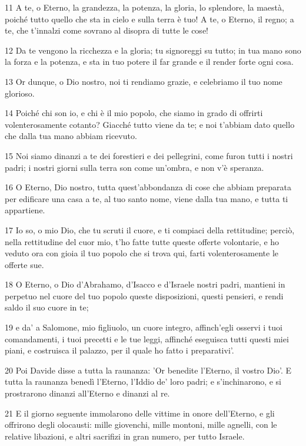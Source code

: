 \par 11 A te, o Eterno, la grandezza, la potenza, la gloria, lo splendore, la maestà, poiché tutto quello che sta in cielo e sulla terra è tuo! A te, o Eterno, il regno; a te, che t'innalzi come sovrano al disopra di tutte le cose!
\par 12 Da te vengono la ricchezza e la gloria; tu signoreggi su tutto; in tua mano sono la forza e la potenza, e sta in tuo potere il far grande e il render forte ogni cosa.
\par 13 Or dunque, o Dio nostro, noi ti rendiamo grazie, e celebriamo il tuo nome glorioso.
\par 14 Poiché chi son io, e chi è il mio popolo, che siamo in grado di offrirti volenterosamente cotanto? Giacché tutto viene da te; e noi t'abbiam dato quello che dalla tua mano abbiam ricevuto.
\par 15 Noi siamo dinanzi a te dei forestieri e dei pellegrini, come furon tutti i nostri padri; i nostri giorni sulla terra son come un'ombra, e non v'è speranza.
\par 16 O Eterno, Dio nostro, tutta quest'abbondanza di cose che abbiam preparata per edificare una casa a te, al tuo santo nome, viene dalla tua mano, e tutta ti appartiene.
\par 17 Io so, o mio Dio, che tu scruti il cuore, e ti compiaci della rettitudine; perciò, nella rettitudine del cuor mio, t'ho fatte tutte queste offerte volontarie, e ho veduto ora con gioia il tuo popolo che si trova qui, farti volenterosamente le offerte sue.
\par 18 O Eterno, o Dio d'Abrahamo, d'Isacco e d'Israele nostri padri, mantieni in perpetuo nel cuore del tuo popolo queste disposizioni, questi pensieri, e rendi saldo il suo cuore in te;
\par 19 e da' a Salomone, mio figliuolo, un cuore integro, affinch'egli osservi i tuoi comandamenti, i tuoi precetti e le tue leggi, affinché eseguisca tutti questi miei piani, e costruisca il palazzo, per il quale ho fatto i preparativi'.
\par 20 Poi Davide disse a tutta la raunanza: 'Or benedite l'Eterno, il vostro Dio'. E tutta la raunanza benedì l'Eterno, l'Iddio de' loro padri; e s'inchinarono, e si prostrarono dinanzi all'Eterno e dinanzi al re.
\par 21 E il giorno seguente immolarono delle vittime in onore dell'Eterno, e gli offrirono degli olocausti: mille giovenchi, mille montoni, mille agnelli, con le relative libazioni, e altri sacrifizi in gran numero, per tutto Israele.
